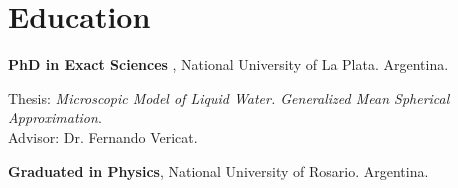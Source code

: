 \section{Education}

 \textbf{PhD in Exact Sciences }, National University of La Plata. Argentina.

Thesis: \emph{Microscopic Model of Liquid Water. Generalized Mean Spherical Approximation}. \\Advisor: Dr. Fernando Vericat.

 \textbf{Graduated in Physics}, National University of Rosario. Argentina.
